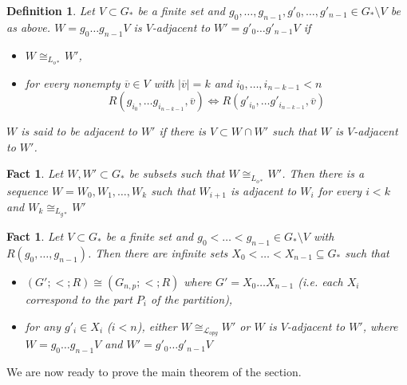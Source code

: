 \documentclass{amsart}
\newtheorem{fact}[teor]{Fact}
\newtheorem{defin}[teor]{Definition}
\newtheorem{external claim}[teor]{Claim}
\newcommand{\mL}{\mathcal{L}}
\begin{document}
\begin{defin} Let $V\subset G_*$ be a finite set and $g_0,\dots,g_{n-1}, g'_0,\dots,g'_{n-1}\in G_*\setminus V$ be as above. 
$W=g_0\dots g_{n-1}V$ is $V$-adjacent to $W'=g'_0\dots g'_{n-1}V$ if \begin{itemize}
    \item $W\cong_{L_{o*}} W'$,
    \item for every nonempty $\overline{v}\in V$ with $\lvert \overline{v}\rvert=k$ and $i_0,\dots,i_{n-k-1}<n$ $$ R(g_{i_0},\dots g_{i_{n-k-1}},\overline{v}) \iff  R(g'_{i_0},\dots g'_{i_{n-k-1}},\overline{v})$$
\end{itemize}
$W$ is said to be adjacent to $W'$ if there is $V\subset W \cap W'$ such that $W$ is $V$-adjacent to $W'$. 
\end{defin}
\begin{fact} \label{ Sequence of adjacent graphs}
    Let $W,W'\subset G_*$ be subsets such that $W\cong_{L_{o*}} W'$. Then there is a sequence $W=W_0,W_1,\dots,W_k$ such that $W_{i+1}$ is adjacent to $W_i$ for every $i<k$ and $W_k\cong_{L_{g*}}W'$
\end{fact}
\begin{fact} \label{Isomorphic copy of random partite hypergraph}
    Let $V\subset G_*$ be a finite set and $g_0<\dots<g_{n-1} \in G_* \setminus V$ with $R(g_0,\dots,g_{n-1})$. Then there are infinite sets $X_0<\dots<X_{n-1}\subseteq G_*$ such that
    \begin{itemize}
        \item $(G';<;R)\cong (G_{n,p};<;R)$ where $G'=X_0\dots X_{n-1}$ (i.e. each $X_i$ correspond to the part $P_i$ of the partition),
        \item for any $g'_i\in X_i$ ($i<n$), either $W\cong_{\mL_{opg}} W'$ or $W$ is $V$-adjacent to $W'$, where $W=g_0\dots g_{n-1}V$ and $W'=g'_0\dots g'_{n-1}V$
    \end{itemize}
\end{fact}

We are now ready to prove the main theorem of the section.
\end{document}
